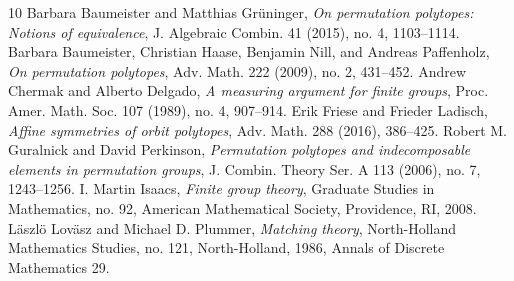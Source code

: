 \documentclass[10pt]{amsart}
\begin{document}
\begin{thebibliography}{10}
 Barbara Baumeister and Matthias Gr\"{u}ninger, \emph{On permutation polytopes: Notions of equivalence}, J. Algebraic Combin. 41 (2015), no. 4, 1103--1114.
 Barbara Baumeister, Christian Haase, Benjamin Nill, and Andreas Paffenholz, \emph{On permutation polytopes}, Adv. Math. 222 (2009), no. 2, 431--452.
 Andrew Chermak and Alberto Delgado, \emph{A measuring argument for finite groups}, Proc. Amer. Math. Soc. 107 (1989), no. 4, 907--914.
 Erik Friese and Frieder Ladisch, \emph{Affine symmetries of orbit polytopes}, Adv. Math. 288 (2016), 386--425.
 Robert M. Guralnick and David Perkinson, \emph{Permutation polytopes and indecomposable elements in permutation groups}, J. Combin. Theory Ser. A 113 (2006), no. 7, 1243--1256.
 I. Martin Isaacs, \emph{Finite group theory}, Graduate Studies in Mathematics, no. 92, American Mathematical Society, Providence, RI, 2008.
 L\"{a}szl\"{o} Lov\"{a}sz and Michael D. Plummer, \emph{Matching theory}, North-Holland Mathematics Studies, no. 121, North-Holland, 1986, Annals of Discrete Mathematics 29.
\end{thebibliography}
\end{document}
